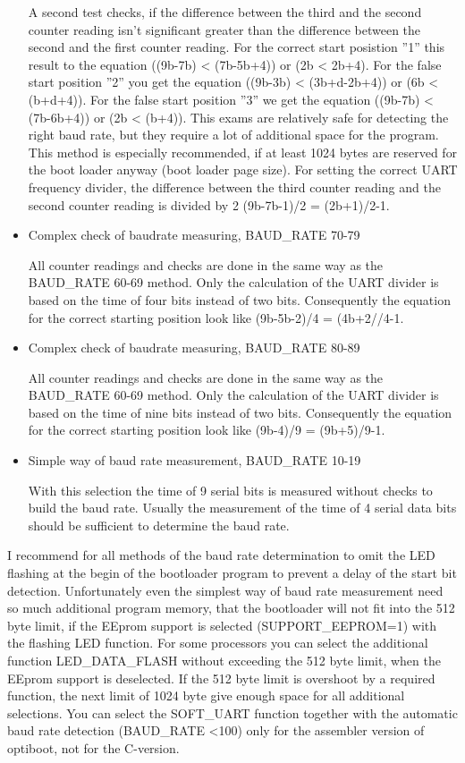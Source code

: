 \begin{itemize}
A second test checks, if the difference between the third and the
second counter reading isn't significant greater than the difference
between the second and the first counter reading.
For the correct start posistion ''1'' this result to the equation ((9b-7b) < (7b-5b+4))
or (2b < 2b+4).
For the false start position ''2'' you get the equation ((9b-3b) < (3b+d-2b+4)) or
(6b < (b+d+4)).
For the false start position ''3'' we get the equation ((9b-7b) < (7b-6b+4)) or (2b < (b+4)).
This exams are relatively safe for detecting the right baud rate, but they
require a lot of additional space for the program.
This method is especially recommended, if at least 1024 bytes are reserved
for the boot loader anyway (boot loader page size).
For setting the correct UART frequency divider, the difference between 
the third counter reading and the second counter reading is divided by 2
(9b-7b-1)/2 = (2b+1)/2-1.

\item {Complex check of baudrate measuring, BAUD\_RATE 70-79}

All counter readings and checks are done in the same way as the
BAUD\_RATE 60-69 method. Only the calculation of
the UART divider is based on the time of four bits instead of two bits.
Consequently the equation for the correct starting position
look like (9b-5b-2)/4 = (4b+2//4-1.

\item {Complex check of baudrate measuring, BAUD\_RATE 80-89}

All counter readings and checks are done in the same way as the
BAUD\_RATE 60-69 method. Only the calculation of
the UART divider is based on the time of nine bits instead of two bits.
Consequently the equation for the correct starting position
look like (9b-4)/9 = (9b+5)/9-1.

\item {Simple way of baud rate measurement, BAUD\_RATE 10-19}

With this selection the time of 9 serial bits is measured without checks
to build the baud rate.
Usually the measurement of the time of 4 serial data bits should be sufficient
to determine the baud rate.

\end{itemize}

I recommend for all methods of the baud rate determination to omit
the LED flashing at the begin of the bootloader program
to prevent a delay of the start bit detection.
Unfortunately even the simplest way of baud rate measurement
need so much additional program memory, that the bootloader
will not fit into the 512 byte limit, if the EEprom support
is selected (SUPPORT\_EEPROM=1) with the flashing LED function.
For some processors you can select the additional function LED\_DATA\_FLASH
without exceeding the 512 byte limit, when the EEprom support is deselected.
If the 512 byte limit is overshoot by a required function,
the next limit of 1024 byte give enough space for all additional
selections.
You can select the SOFT\_UART function together with the automatic
baud rate detection (BAUD\_RATE \textless 100) only for the
assembler version of optiboot, not for the C-version.

